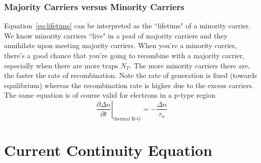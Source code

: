 \subsubsection*{Majority Carriers versus Minority Carriers}
Equation~\ref{eq:lifetime} can be interpreted as the ``lifetime" of a minority carrier.  We know minority carriers ``live" in a pool of majority carriers and they annihilate upon meeting majority carriers.  When you're a minority carrier, there's a good chance that you're going to recombine with a majority carrier, especially when there are more traps $N_T$.  The more minority carriers there are, the faster the rate of recombination.  Note the rate of generation is fixed (towards equilibrium) whereas the recombination rate is higher due to the excess carriers.  The same equation is of course valid for electrons in a p-type region
    \begin{equation}
        \left. \frac{\partial \Delta n}{\partial t} \right|_{\text{thermal R-G}} = - \frac{\Delta n}{\tau_n}
    \end{equation}
\section{Current Continuity Equation}
